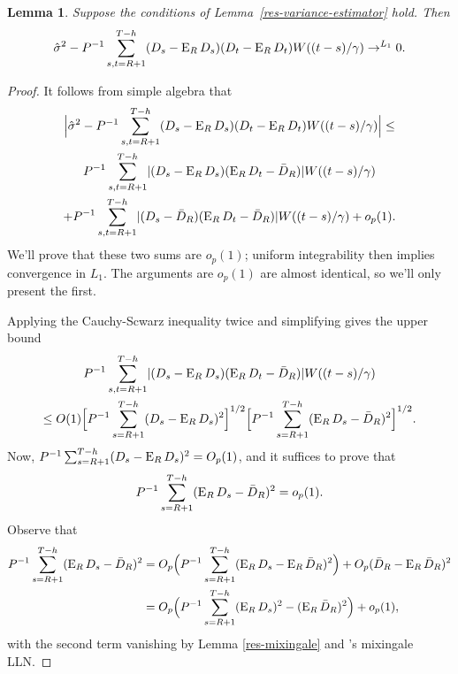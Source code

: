 \documentclass[11pt]{article}
\newtheorem{lem}{Lemma}
\newcommand{\citepos}[1]{\citeauthor{#1}'s \citeyearpar{#1}}
\begin{document}
\begin{lem}\label{lem:a6}
  Suppose the conditions of Lemma~\ref{res-variance-estimator} hold.
  Then
  \begin{equation*}
    \hat{\sigma}^2 - P^{-1} \sum_{s,t=R+1}^{T-h} (D_s - \operatorname{E}_R
    D_s) (D_t - \operatorname{E}_R D_t) W((t-s)/\gamma) \to^{L_1} 0.
  \end{equation*}
\end{lem}

\begin{proof}
   It follows from simple algebra that
\begin{multline*}
  \Big| \hat{\sigma}^2 -  P^{-1} \sum_{s,t=R+1}^{T-h} (D_s - \operatorname{E}_R
    D_s) (D_t - \operatorname{E}_R D_t) W((t-s)/\gamma) \Big| \leq\\
  P^{-1} \sum_{s,t=R+1}^{T-h} \lvert (D_s - \operatorname{E}_R D_s)(\operatorname{E}_R D_t - \bar{D}_{R}) \rvert W((t-s)/\gamma) \\ + P^{-1} \sum_{s,t=R+1}^{T-h} \lvert (D_s -
  \bar{D}_{R})(\operatorname{E}_R D_t - \bar{D}_{R}) \rvert W((t-s)/\gamma) + o_p(1).
\end{multline*}
We'll prove that these two sums are $o_p(1)$; uniform integrability
then implies convergence in $L_1$.  The arguments are $o_p(1)$ are
almost identical, so we'll only present the first.

Applying the Cauchy-Scwarz inequality twice and simplifying gives the
upper bound
\begin{multline*}
P^{-1} \sum_{s,t=R+1}^{T-h} \lvert (D_s - \operatorname{E}_R D_s)(\operatorname{E}_R D_t - \bar{D}_{R}) \rvert W((t-s)/\gamma) \\ \leq O(1) \Big[P^{-1} \sum_{s=R+1}^{T-h} (D_s - \operatorname{E}_R D_s)^2\Big]^{1/2} \Big[P^{-1} \sum_{s=R+1}^{T-h}(\operatorname{E}_R D_s - \bar{D}_{R} )^2\Big]^{1/2}.
\end{multline*}
Now,
$P^{-1} \sum_{s=R+1}^{T-h}(D_s - \operatorname{E}_R D_s)^2 = O_p(1)$, and it suffices to prove
that \[P^{-1} \sum_{s=R+1}^{T-h}(\operatorname{E}_R D_s - \bar{D}_{R} )^2 = o_p(1).\]  Observe that
\begin{align*}
  P^{-1} \sum_{s=R+1}^{T-h}(\operatorname{E}_R D_s - \bar{D}_{R} )^2 & = O_p\Big(P^{-1} \sum_{s=R+1}^{T-h}(\operatorname{E}_{R}D_s -
  \operatorname{E}_R\bar{D}_{R})^2\Big) + O_p(\bar{D}_{R} - \operatorname{E}_R\bar{D}_{R})^{2} \\
  &= O_p\Big(P^{-1} \sum_{s=R+1}^{T-h} (\operatorname{E}_RD_s)^2 - (\operatorname{E}_R\bar{D}_{R})^2\Big) +
  o_p(1),
\end{align*}
with the second term vanishing by Lemma \ref{res-mixingale} and
\citepos{Dav:93} mixingale LLN.


\end{proof}
\end{document}
